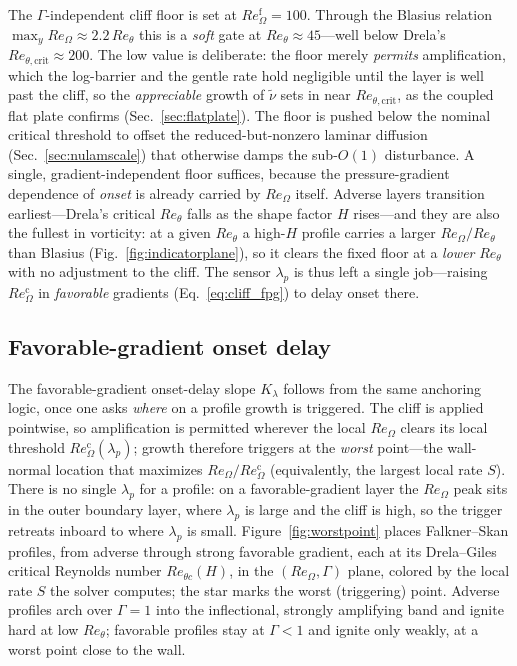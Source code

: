 \documentclass[journal]{new-aiaa}
\begin{document}
The $\Gamma$-independent cliff floor is set at $Re_\Omega^{\mathrm{f}}\!=\!100$.
Through the Blasius relation $\max_y Re_\Omega\!\approx\!2.2\,Re_\theta$ this is a
\emph{soft} gate at $Re_\theta\!\approx\!45$---well below Drela's
$Re_{\theta,\mathrm{crit}}\!\approx\!200$. The low value is deliberate: the
floor merely \emph{permits} amplification, which the log-barrier
and the gentle rate hold negligible until the layer is well past the cliff, so
the \emph{appreciable} growth of $\tilde\nu$ sets in near
$Re_{\theta,\mathrm{crit}}$, as the coupled flat plate confirms
(Sec.~\ref{sec:flatplate}). The floor is pushed below the nominal critical
threshold to offset the reduced-but-nonzero laminar diffusion
(Sec.~\ref{sec:nulamscale}) that otherwise damps the sub-$O(1)$ disturbance.
A single, gradient-independent floor suffices, because the pressure-gradient
dependence of \emph{onset} is already carried by $Re_\Omega$ itself. Adverse
layers transition earliest---Drela's critical $Re_\theta$ falls as the shape
factor $H$ rises---and they are also the fullest in vorticity: at a given
$Re_\theta$ a high-$H$ profile carries a larger $Re_\Omega/Re_\theta$ than Blasius
(Fig.~\ref{fig:indicatorplane}), so it clears the fixed floor at a \emph{lower}
$Re_\theta$ with no adjustment to the cliff. The sensor $\lambda_p$ is thus left a
single job---raising $Re_\Omega^{\mathrm{c}}$ in \emph{favorable} gradients
(Eq.~\eqref{eq:cliff_fpg}) to delay onset there.

\subsection{Favorable-gradient onset delay}\label{sec:calib_klambda}

The favorable-gradient onset-delay slope $K_\lambda$ follows from the same
anchoring logic, once one asks \emph{where} on a profile growth is triggered.
The cliff is applied pointwise, so amplification is permitted wherever the local
$Re_\Omega$ clears its local threshold $Re_\Omega^{\mathrm{c}}(\lambda_p)$; growth
therefore triggers at the \emph{worst} point---the wall-normal location that
maximizes $Re_\Omega/Re_\Omega^{\mathrm{c}}$ (equivalently, the largest local rate
$S$). There is no single $\lambda_p$ for a profile: on a favorable-gradient layer
the $Re_\Omega$ peak sits in the outer boundary layer, where $\lambda_p$ is large
and the cliff is high, so the trigger retreats inboard to where $\lambda_p$ is
small. Figure~\ref{fig:worstpoint} places Falkner--Skan profiles, from adverse
through strong favorable gradient, each at its Drela--Giles critical Reynolds
number $Re_{\theta c}(H)$, in the $(Re_\Omega,\Gamma)$ plane, colored by the local
rate $S$ the solver computes; the star marks the worst (triggering) point.
Adverse profiles arch over $\Gamma\!=\!1$ into the inflectional, strongly
amplifying band and ignite hard at low $Re_\theta$; favorable profiles stay at
$\Gamma\!<\!1$ and ignite only weakly, at a worst point close to the wall.
\end{document}
